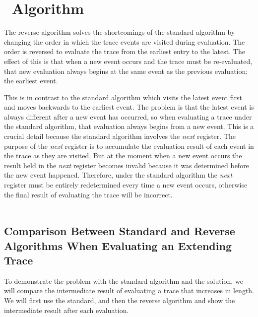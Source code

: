 \chapter{\RRH\ Algorithm}
\label{chap:Reverse Rosu-Havelund Algorithm}

The reverse algorithm solves the shortcomings of the standard algorithm by changing the order in which the trace events are visited during evaluation.  The order is reversed to evaluate the trace from the earliest entry to the latest.  The effect of this is that when a new event occurs and the trace must be re-evaluated, that new evaluation always begins at the same event as the previous evaluation; the earliest event.

This is in contrast to the standard algorithm which visits the latest event first and moves backwards to the earliest event.  The problem is that the latest event is always different after a new event has occurred, so when evaluating a trace under the standard algorithm, that evaluation always begins from a new event.  This is a crucial detail because the standard algorithm involves the \textit{next} register.  The purpose of the \textit{next} register is to accumulate the evaluation result of each event in the trace as they are visited.  But at the moment when a new event occurs the result held in the \textit{next} register becomes invalid because it was determined before the new event happened.  Therefore, under the standard algorithm the \textit{next} register must be entirely redetermined every time a new event occurs, otherwise the final result of evaluating the trace will be incorrect.\\
\\
\section{Comparison Between Standard and Reverse Algorithms When Evaluating an Extending Trace}

To demonstrate the problem with the standard algorithm and the solution, we will compare the intermediate result of evaluating a trace that increases in length.  We will first use the standard, and then the reverse algorithm and show the intermediate result after each evaluation.  

